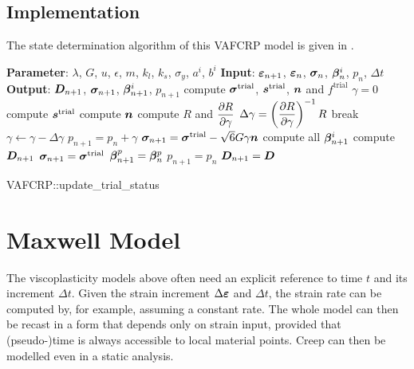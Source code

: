 \subsection{Implementation}
The state determination algorithm of this VAFCRP model is given in .
\begin{breakablealgorithm}
\caption{state determination of VAFCRP model}\label{algo:vafcrp_model}
\begin{algorithmic}
\State \textbf{Parameter}: $\lambda$, $G$, $u$, $\epsilon$, $m$, $k_l$, $k_s$, $\sigma_y$, $a^i$, $b^i$
\State \textbf{Input}: $\bm{\varepsilon}_{n+1}$, $\bm{\varepsilon}_n$, $\bm{\sigma}_n$, $\bm{\beta}_n^i$, $p_n$, $\Delta{}t$
\State \textbf{Output}: $\bm{D}_{n+1}$, $\bm{\sigma}_{n+1}$, $\bm{\beta}_{n+1}^i$, $p_{n+1}$
\State compute $\bm{\sigma}^\text{trial}$, $\bm{s}^\text{trial}$, $\bm{n}$ and $f^\text{trial}$
\State $\gamma=0$
\State compute $\bm{s}^\text{trial}$
\State compute $\bm{n}$
\State compute $R$ and $\dfrac{\partial{R}}{\partial{\gamma}}$
\State $\Delta\gamma=\left(\dfrac{\partial{R}}{\partial{\gamma}}\right)^{-1}R$
\State break
\EndIf
\State $\gamma\leftarrow\gamma-\Delta\gamma$
\State $p_{n+1}=p_n+\gamma$
\EndWhile
\State $\bm{\sigma}_{n+1}=\bm{\sigma}^\text{trial}-\sqrt{6}G\gamma\bm{n}$
\State compute all $\bm{\beta}_{n+1}^i$
\State compute $\bm{D}_{n+1}$
\Else
\State $\bm{\sigma}_{n+1}=\bm{\sigma}^\text{trial}$
\State $\bm{\beta}^p_{n+1}=\bm{\beta}^p_n$
\State $p_{n+1}=p_n$
\State $\bm{D}_{n+1}=\bm{D}$
\EndIf
\end{algorithmic}
\end{breakablealgorithm}
\begin{cppcode}
VAFCRP::update_trial_status
\end{cppcode}
\section{Maxwell Model}
The viscoplasticity models above often need an explicit reference to time $t$ and its increment $\Delta{}t$.
Given the strain increment $\Delta{}\bm{\varepsilon}$ and $\Delta{}t$, the strain rate can be computed by, for example, assuming a constant rate.
The whole model can then be recast in a form that depends only on strain input, provided that (pseudo-)time is always accessible to local material points.
Creep can then be modelled even in a static analysis.

